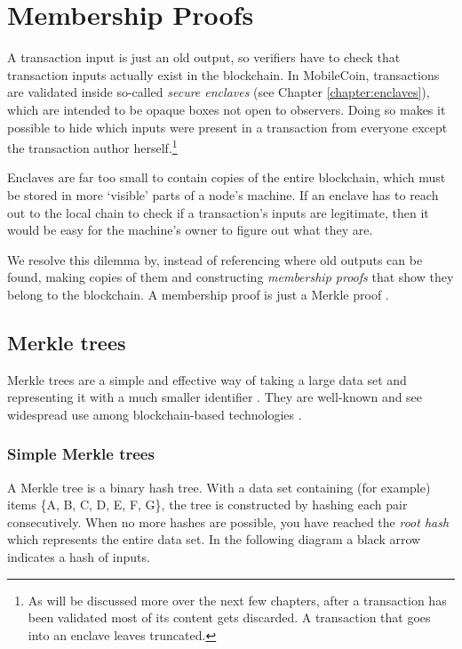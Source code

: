 \chapter{Membership Proofs}
\label{chapter:membership-proofs} 

A transaction input is just an old output, so verifiers have to check that transaction inputs actually exist in the blockchain. In MobileCoin, transactions are validated inside so-called {\em secure enclaves} (see Chapter \ref{chapter:enclaves}), which are intended to be opaque boxes not open to observers. Doing so makes it possible to hide which inputs were present in a transaction from everyone except the transaction author herself.\footnote{As will be discussed more over the next few chapters, after a transaction has been validated most of its content gets discarded. A transaction that goes into an enclave leaves truncated.}

Enclaves are far too small to contain copies of the entire blockchain, which must be stored in more `visible' parts of a node's machine. If an enclave has to reach out to the local chain to check if a transaction's inputs are legitimate, then it would be easy for the machine's owner to figure out what they are.

We resolve this dilemma by, instead of referencing where old outputs can be found, making copies of them and constructing {\em membership proofs} that show they belong to the blockchain. A membership proof is just a Merkle proof \cite{merkle-tree}.



\section{Merkle trees}
\label{sec:merkle-trees}

Merkle trees \cite{merkle-tree} are a simple and effective way of taking a large data set and representing it with a much smaller identifier \cite{merkle-how-log-proofs-work}. They are well-known and see widespread use among blockchain-based technologies \cite{merkle-trees-article}.


\subsection{Simple Merkle trees}
\label{subsec:simple-merkle-trees}

A Merkle tree is a binary hash tree. With a data set containing (for example) items \{A, B, C, D, E, F, G\}, the tree is constructed by hashing each pair consecutively. When no more hashes are possible, you have reached the {\em root hash} which represents the entire data set. In the following diagram a black arrow indicates a hash of inputs.


